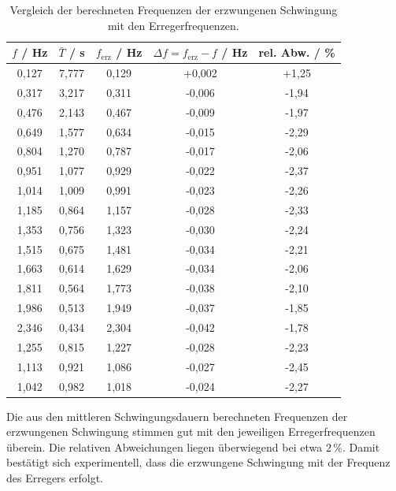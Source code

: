 \documentclass{report}
\begin{document}
\begin{table}[h]
    \centering
    \begin{tabular}{c c c c c}
        \hline
        $f$ / Hz & $\bar T$ / s & $f_\mathrm{erz}$ / Hz & $\Delta f = f_\mathrm{erz}-f$ / Hz & rel. Abw. / \% \\
        \hline
        0{,}127 & 7{,}777 & 0{,}129 & +0{,}002 & +1{,}25 \\
        0{,}317 & 3{,}217 & 0{,}311 & -0{,}006 & -1{,}94 \\
        0{,}476 & 2{,}143 & 0{,}467 & -0{,}009 & -1{,}97 \\
        0{,}649 & 1{,}577 & 0{,}634 & -0{,}015 & -2{,}29 \\
        0{,}804 & 1{,}270 & 0{,}787 & -0{,}017 & -2{,}06 \\
        0{,}951 & 1{,}077 & 0{,}929 & -0{,}022 & -2{,}37 \\
        1{,}014 & 1{,}009 & 0{,}991 & -0{,}023 & -2{,}26 \\
        1{,}185 & 0{,}864 & 1{,}157 & -0{,}028 & -2{,}33 \\
        1{,}353 & 0{,}756 & 1{,}323 & -0{,}030 & -2{,}24 \\
        1{,}515 & 0{,}675 & 1{,}481 & -0{,}034 & -2{,}21 \\
        1{,}663 & 0{,}614 & 1{,}629 & -0{,}034 & -2{,}06 \\
        1{,}811 & 0{,}564 & 1{,}773 & -0{,}038 & -2{,}10 \\
        1{,}986 & 0{,}513 & 1{,}949 & -0{,}037 & -1{,}85 \\
        2{,}346 & 0{,}434 & 2{,}304 & -0{,}042 & -1{,}78 \\
        1{,}255 & 0{,}815 & 1{,}227 & -0{,}028 & -2{,}23 \\
        1{,}113 & 0{,}921 & 1{,}086 & -0{,}027 & -2{,}45 \\
        1{,}042 & 0{,}982 & 1{,}018 & -0{,}024 & -2{,}27 \\
        \hline
    \end{tabular}
    \caption{Vergleich der berechneten Frequenzen der erzwungenen Schwingung mit den Erregerfrequenzen.}
\end{table}

Die aus den mittleren Schwingungsdauern berechneten Frequenzen der erzwungenen Schwingung 
stimmen gut mit den jeweiligen Erregerfrequenzen überein. 
Die relativen Abweichungen liegen überwiegend bei etwa $2\,\%$. 
Damit bestätigt sich experimentell, 
dass die erzwungene Schwingung mit der Frequenz des Erregers erfolgt.
\end{document}
